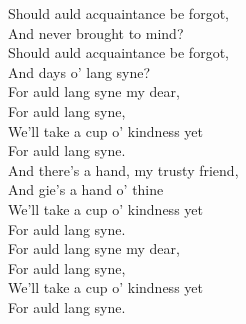 \documentclass[a6paper,10pt]{article}
\begin{document}
\setlength{\oddsidemargin}{-0.37in}
\begin{center}
\end{center}
\begin{lyrics}
Should auld acquaintance be forgot, \\
And never brought to mind? \\
Should auld acquaintance be forgot, \\
And days o' lang syne? \\
For auld lang syne my dear, \\
For auld lang syne, \\
We'll take a cup o' kindness yet \\
For auld lang syne. \\
\newline
And there's a hand, my trusty friend, \\
And gie's a hand o' thine \\
We'll take a cup o' kindness yet \\
For auld lang syne. \\
For auld lang syne my dear, \\
For auld lang syne, \\
We'll take a cup o' kindness yet \\
For auld lang syne.
\end{lyrics}
\end{document}
